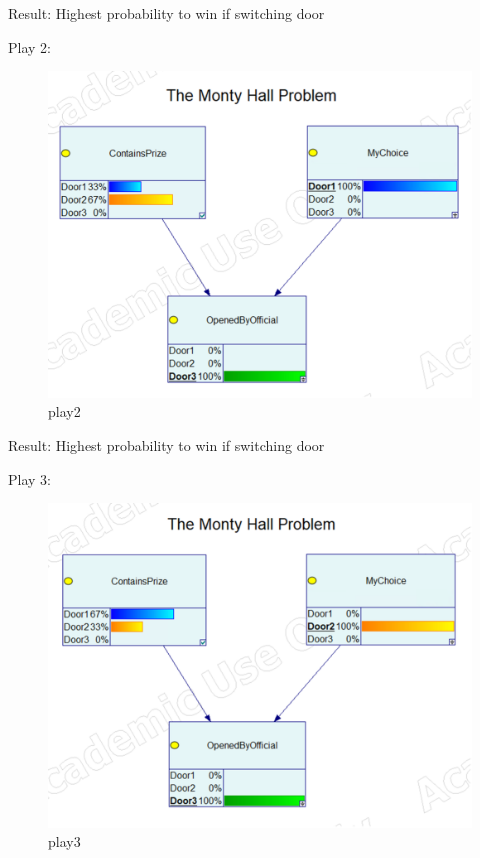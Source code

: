 \documentclass{article}
\begin{document}
Result: Highest probability to win if switching door

\newpage

Play 2:

\begin{figure}[hbtp]
    \centering
    \includegraphics[width=\linewidth]{images/play2.png}
    \caption{play2}
    \label{fig:image5}
\end{figure}

Result: Highest probability to win if switching door

\newpage

Play 3:

\begin{figure}[hbtp]
    \centering
    \includegraphics[width=\linewidth]{images/play3.png}
    \caption{play3}
    \label{fig:image6}
\end{figure}
\end{document}
